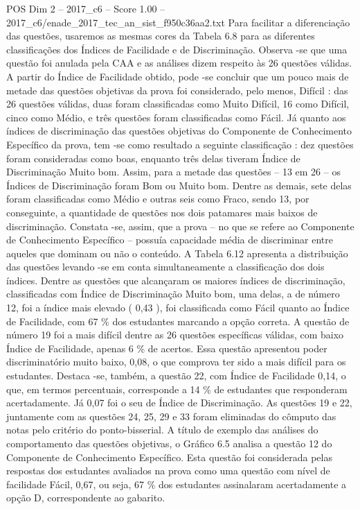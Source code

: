 \begin{textsample}{POS Dim 2 – 2017\_c6 – Score 1.00 – 2017\_c6/enade\_2017\_tec\_an\_sist\_f950c36aa2.txt}
Para facilitar a diferenciação das questões, usaremos as mesmas cores da Tabela 6.8 para as diferentes classificações dos Índices de Facilidade e de Discriminação.
Observa -se que uma questão foi anulada pela CAA e as análises dizem respeito às 26 questões válidas.
A partir do Índice de Facilidade obtido, pode -se concluir que um pouco mais de metade das questões objetivas da prova foi considerado, pelo menos, Difícil : das 26 questões válidas, duas foram classificadas como Muito Difícil, 16 como Difícil, cinco como Médio, e três questões foram classificadas como Fácil.
Já quanto aos índices de discriminação das questões objetivas do Componente de Conhecimento Específico da prova, tem -se como resultado a seguinte classificação : dez questões foram consideradas como boas, enquanto três delas tiveram Índice de Discriminação Muito bom.
Assim, para a metade das questões – 13 em 26 – os Índices de Discriminação foram Bom ou Muito bom.
Dentre as demais, sete delas foram classificadas como Médio e outras seis como Fraco, sendo 13, por conseguinte, a quantidade de questões nos dois patamares mais baixos de discriminação.
Constata -se, assim, que a prova – no que se refere ao Componente de Conhecimento Específico – possuía capacidade média de discriminar entre aqueles que dominam ou não o conteúdo.
A Tabela 6.12 apresenta a distribuição das questões levando -se em conta simultaneamente a classificação dos dois índices.
Dentre as questões que alcançaram os maiores índices de discriminação, classificadas com Índice de Discriminação Muito bom, uma delas, a de número 12, foi a índice mais elevado ( 0,43 ), foi classificada como Fácil quanto ao Índice de Facilidade, com 67 \% dos estudantes marcando a opção correta.
A questão de número 19 foi a mais difícil dentre as 26 questões específicas válidas, com baixo Índice de Facilidade, apenas 6 \% de acertos.
Essa questão apresentou poder discriminatório muito baixo, 0,08, o que comprova ter sido a mais difícil para os estudantes.
Destaca -se, também, a questão 22, com Índice de Facilidade 0,14, o que, em termos percentuais, corresponde a 14 \% de estudantes que responderam acertadamente.
Já 0,07 foi o seu de Índice de Discriminação.
As questões 19 e 22, juntamente com as questões 24, 25, 29 e 33 foram eliminadas do cômputo das notas pelo critério do ponto-bisserial.
A título de exemplo das análises do comportamento das questões objetivas, o Gráfico 6.5 analisa a questão 12 do Componente de Conhecimento Específico.
Esta questão foi considerada pelas respostas dos estudantes avaliados na prova como uma questão com nível de facilidade Fácil, 0,67, ou seja, 67 \% dos estudantes assinalaram acertadamente a opção D, correspondente ao gabarito.

\end{textsample}
